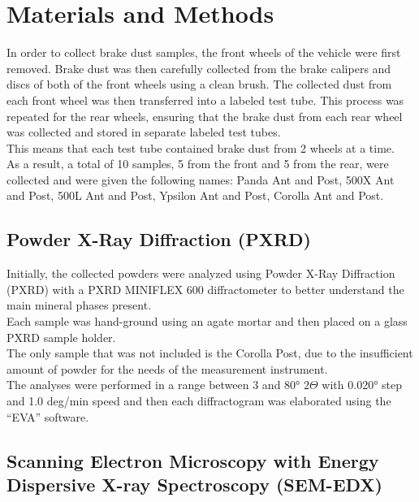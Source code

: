 \chapter{Materials and Methods}

In order to collect brake dust samples, the front wheels of the vehicle were first removed. Brake dust was then carefully collected from the brake calipers and discs of both of the front wheels using a clean brush. The collected dust from each front wheel was then transferred into a labeled test tube. This process was repeated for the rear wheels, ensuring that the brake dust from each rear wheel was collected and stored in separate labeled test tubes.\\
This means that each test tube contained brake dust from 2 wheels at a time. \\
As a result, a total of 10 samples, 5 from the front and 5 from the rear, were collected and were given the following names: Panda Ant and Post, 500X Ant and Post, 500L Ant and Post, Ypsilon Ant and Post, Corolla Ant and Post.

\section{Powder X-Ray Diffraction (PXRD)}

Initially, the collected powders were analyzed using Powder X-Ray Diffraction (PXRD) with a PXRD MINIFLEX 600 diffractometer to better understand the main mineral phases present. \\
Each sample was hand-ground using an agate mortar and then placed on a glass PXRD sample holder. \\
The only sample that was not included is the Corolla Post, due to the insufficient amount of powder for the needs of the measurement instrument.\\
The analyses were performed in a range between 3 and 80° $2\Theta$ with 0.020° step and 1.0 deg/min speed and then each diffractogram was elaborated using the “EVA” software.

\section{Scanning Electron Microscopy with Energy Dispersive X-ray Spectroscopy (SEM-EDX)}

